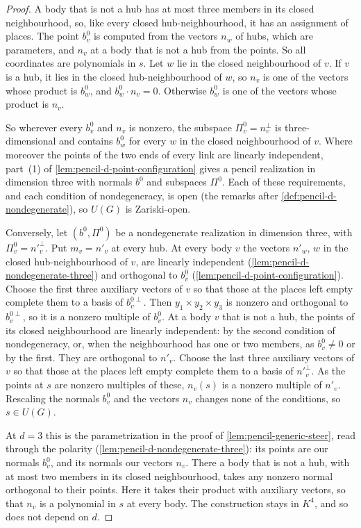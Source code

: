 \begin{proof}
  \leanok
  A body that is not a hub has at most three members in its closed
  neighbourhood, so, like every closed hub-neighbourhood, it has an
  assignment of places. The point $b^0_v$ is computed from the vectors
  $n_w$ of hubs, which are parameters, and $n_v$ at a body that is not a
  hub from the points. So all coordinates are polynomials in $s$. Let $w$ lie in
  the closed neighbourhood of $v$. If $v$ is a hub, it lies in the closed
  hub-neighbourhood of $w$, so $n_v$ is one of the vectors whose product
  is $b^0_w$, and $b^0_w \cdot n_v = 0$. Otherwise $b^0_w$ is one of the
  vectors whose product is $n_v$.

  So wherever every $b^0_v$ and $n_v$ is nonzero, the subspace
  $\Pi^0_v = n_v^{\perp}$ is three-dimensional and contains $b^0_w$ for
  every $w$ in the closed neighbourhood of $v$. Where moreover the points
  of the two ends of every link are linearly independent, part~(1) of
  \cref{lem:pencil-d-point-configuration} gives a pencil realization in
  dimension three with normals $b^0$ and subspaces $\Pi^0$. Each of these
  requirements, and each condition of nondegeneracy, is open (the remarks
  after \cref{def:pencil-d-nondegenerate}), so $U(G)$ is Zariski-open.

  Conversely, let $(b^0, \Pi^0)$ be a nondegenerate realization in
  dimension three, with $\Pi^0_v = n'^{\perp}_v$. Put $m_v = n'_v$ at
  every hub. At every body $v$ the vectors $n'_w$, $w$ in the closed
  hub-neighbourhood of $v$, are linearly independent
  (\cref{lem:pencil-d-nondegenerate-three}) and orthogonal to $b^0_v$
  (\cref{lem:pencil-d-point-configuration}). Choose the first three
  auxiliary vectors of $v$ so that those at the places left empty complete
  them to a basis of $b^{0\perp}_v$. Then $y_1 \times y_2 \times y_3$ is
  nonzero and orthogonal to $b^{0\perp}_v$, so it is a nonzero multiple
  of $b^0_v$. At a body $v$
  that is not a hub, the points of its closed neighbourhood are linearly
  independent: by the second condition of nondegeneracy, or, when the
  neighbourhood has one or two members, as $b^0_v \ne 0$ or by the first.
  They are orthogonal to $n'_v$. Choose the last three auxiliary vectors
  of $v$ so that those at the places left empty complete them to a basis
  of $n'^{\perp}_v$. As the points at $s$ are nonzero multiples of these,
  $n_v(s)$ is a nonzero multiple of $n'_v$.
  Rescaling the normals $b^0_v$ and the vectors $n_v$ changes none of the
  conditions, so $s \in U(G)$.

  At $d = 3$ this is the parametrization in the proof of
  \cref{lem:pencil-generic-steer}, read through the polarity
  (\cref{lem:pencil-d-nondegenerate-three}): its points are our normals
  $b^0_v$, and its normals our vectors $n_v$. There a body that is not a
  hub, with at most two members in its closed neighbourhood, takes any
  nonzero normal orthogonal to their points. Here it takes their product
  with auxiliary vectors, so that $n_v$ is a polynomial in $s$ at every
  body. The construction stays in $K^4$, and so does not depend on $d$.
\end{proof}

